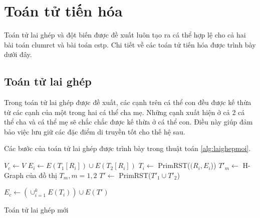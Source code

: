 \section{Toán tử tiến hóa} \label{chap_mfeaProposed:sec:ToanTuTienHoa}
Toán tử lai ghép và đột biến được đề xuất luôn tạo ra cá thể hợp lệ cho cả hai bài toán \gls{clumrct} và bài toán \gls{cstp}. Chi tiết về các toán tử tiến hóa được trình bày dưới đây.

\subsection{Toán tử lai ghép} \label{chap_coso:sec_mfea:subsec:toantulaighep}
Trong toán tử lai ghép được đề xuất, các cạnh trên cá thể con đều được kế thừa từ các cạnh của một trong hai cá thể cha mẹ. Những cạnh xuất hiện ở cả 2 cá thể cha và cá thể mẹ sẽ chắc chắc được kế thừa ở cá  thể con. Điều này giúp đảm bảo việc lưu giữ các đặc điểm di truyền tốt cho thế hệ sau.

Các bước của toán tử lai ghép được trình bày trong thuật toán \ref{alg:laighepmoi}.
\begin{algorithm}[htb]
	\BlankLine
	\Begin
	{	
		$V_c \leftarrow V$\;
		{
			$E_i \leftarrow E(T_1[R_i]) \cup E(T_2[R_i])$ \;
			$T_i \leftarrow$ PrimRST($(R_i, E_i$)) \;
		}
		$T'_m \leftarrow$ H-Graph của đồ thị $T_m, m = 1,2$\;
		$T' \leftarrow$ PrimRST($T'_1 \cup T'_2$) \;
		
		$E_c \leftarrow \left( \cup_{i=1}^{k} E(T_i) \right)\cup E(T')$ \;
	}
	\caption{Toán tử lai ghép mới}
	\label{alg:laighepmoi}
\end{algorithm}

